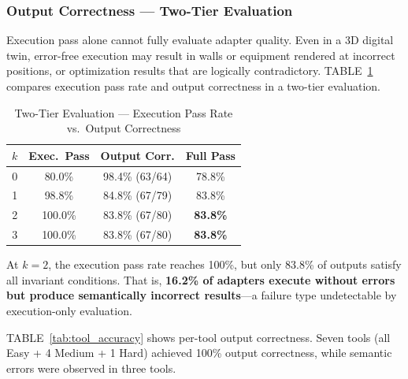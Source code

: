 \documentclass[conference]{IEEEtran}
\begin{document}
\subsubsection{Output Correctness --- Two-Tier Evaluation}

Execution pass alone cannot fully evaluate adapter quality. Even in a 3D digital twin, error-free execution may result in walls or equipment rendered at incorrect positions, or optimization results that are logically contradictory. TABLE~\ref{tab:two_tier} compares execution pass rate and output correctness in a two-tier evaluation.

\begin{table}[!t]
\caption{Two-Tier Evaluation --- Execution Pass Rate vs.\ Output Correctness}
\label{tab:two_tier}
\centering
\begin{tabular}{c c c c}
\hline
$k$ & \textbf{Exec.\ Pass} & \textbf{Output Corr.} & \textbf{Full Pass} \\
\hline
0 & 80.0\%  & 98.4\% (63/64)  & 78.8\% \\
1 & 98.8\%  & 84.8\% (67/79)  & 83.8\% \\
2 & 100.0\% & 83.8\% (67/80)  & \textbf{83.8\%} \\
3 & 100.0\% & 83.8\% (67/80)  & \textbf{83.8\%} \\
\hline
\end{tabular}
\end{table}

At $k{=}2$, the execution pass rate reaches 100\%, but only 83.8\% of outputs satisfy all invariant conditions. That is, \textbf{16.2\% of adapters execute without errors but produce semantically incorrect results}---a failure type undetectable by execution-only evaluation.

TABLE~\ref{tab:tool_accuracy} shows per-tool output correctness. Seven tools (all Easy + 4 Medium + 1 Hard) achieved 100\% output correctness, while semantic errors were observed in three tools.
\end{document}
